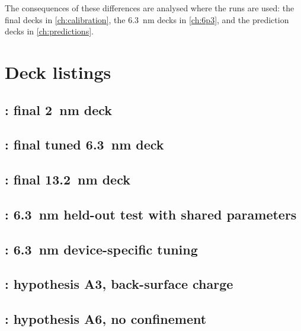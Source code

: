 The consequences of these differences are analysed where the runs are used: the final decks in \cref{ch:calibration},
the \SI{6.3}{nm} decks in \cref{ch:6p3}, and the prediction decks in \cref{ch:predictions}.

\section{Deck listings}\label{sec:decks-listings}

\subsection{: final \SI{2}{nm} deck}


\subsection{: final tuned \SI{6.3}{nm} deck}


\subsection{: final \SI{13.2}{nm} deck}


\subsection{: \SI{6.3}{nm} held-out test with shared parameters}


\subsection{: \SI{6.3}{nm} device-specific tuning}


\subsection{: hypothesis A3, back-surface charge}


\subsection{: hypothesis A6, no confinement}


